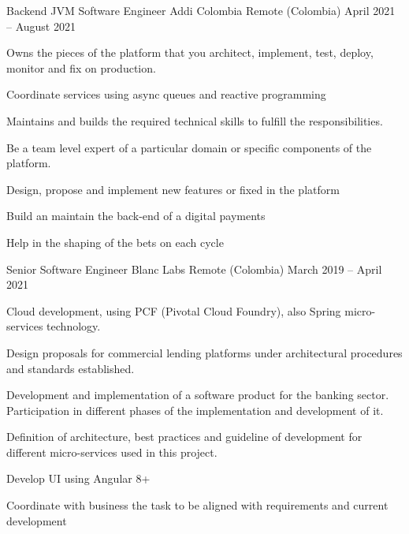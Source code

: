 \begin{cventries}
  \cventry
    {Backend JVM Software Engineer} %
    {Addi Colombia} %
    {Remote (Colombia)} %
    {April 2021 – August 2021} %
    {
      \begin{cvitems} %
        \item {Owns the pieces of the platform that you architect, implement, test, deploy, monitor and fix on production.}
        \item {Coordinate services using async queues and reactive programming}
        \item {Maintains and builds the required technical skills to fulfill the responsibilities.}
        \item {Be a team level expert of a particular domain or specific components of the platform.}
        \item {Design, propose and implement new features or fixed in the platform}
        \item {Build an maintain the back-end of a digital payments}
        \item {Help in the shaping of the bets on each cycle}
      \end{cvitems}
    }

  \cventry
    {Senior Software Engineer} %
    {Blanc Labs} %
    {Remote (Colombia)} %
    {March 2019 – April 2021} %
    {
      \begin{cvitems} %
        \item {Cloud development, using PCF (Pivotal Cloud Foundry), also Spring micro-services technology.}
        \item {Design proposals for commercial lending platforms under architectural procedures and standards established.}
        \item {Development and implementation of a software product for the banking sector. Participation in different phases of the implementation and development of it.}
        \item {Definition of architecture, best practices and guideline of development for different micro-services used in this project.}
        \item {Develop UI using Angular 8+}
        \item {Coordinate with business the task to be aligned with requirements and current development}
      \end{cvitems}
    }


\end{cventries}
